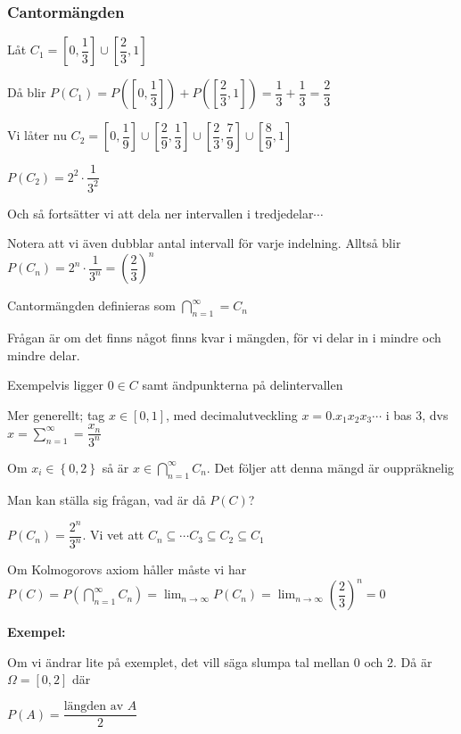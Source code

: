 \subsubsection{Cantormängden}
\par\bigskip
\noindent Låt $C_1 = [0,\dfrac{1}{3}]\cup[\dfrac{2}{3},1]$\par
\noindent Då blir $P(C_1) = P([0,\dfrac{1}{3}])+P([\dfrac{2}{3},1]) = \dfrac{1}{3}+\dfrac{1}{3}=\dfrac{2}{3}$
\par\bigskip
\noindent Vi låter nu $C_2 = [0,\dfrac{1}{9}]\cup[\dfrac{2}{9},\dfrac{1}{3}]\cup[\dfrac{2}{3},\dfrac{7}{9}]\cup[\dfrac{8}{9},1]$\par
\noindent $P(C_2) = 2^2\cdot\dfrac{1}{3^2}$\par
\par\bigskip
\noindent Och så fortsätter vi att dela ner intervallen i tredjedelar$\cdots$\par
\noindent Notera att vi även dubblar antal intervall för varje indelning. Alltså blir $P(C_n) = 2^n\cdot\dfrac{1}{3^n} = \left(\dfrac{2}{3}\right)^n$
\par\bigskip
\noindent Cantormängden definieras som $\bigcap_{n=1}^{\infty} = C_n$\par
\noindent Frågan är om det finns något finns kvar i mängden, för vi delar in i mindre och mindre delar.\par
\noindent Exempelvis ligger $0\in C$ samt ändpunkterna på delintervallen
\par\bigskip
\noindent Mer generellt; tag $x\in[0,1]$, med decimalutveckling $x = 0.x_1x_2x_3\cdots$ i bas 3, dvs $x = \sum_{n=1}^{\infty} = \dfrac{x_n}{3^n}$\par
\noindent Om $x_i\in\left\{0,2\right\}$ så är $x\in\bigcap_{n=1}^{\infty} C_n$. Det följer att denna mängd är ouppräknelig
\par\bigskip
\noindent Man kan ställa sig frågan, vad är då $P(C)$?\par
\noindent $P(C_n) = \dfrac{2^n}{3^n}$. Vi vet att $C_n\subseteq\cdots C_3\subseteq C_2\subseteq C_1$\par
\noindent Om Kolmogorovs axiom håller måste vi har $P(C) = P\left(\bigcap_{n=1}^{\infty}C_n\right) = \lim_{n\to\infty}P(C_n) = \lim_{n\to\infty}\left(\dfrac{2}{3}\right)^n=0$
\par\bigskip
\noindent\textbf{Exempel:}\par
\noindent Om vi ändrar lite på exemplet, det vill säga slumpa tal mellan 0 och 2. Då är $\Omega = [0,2]$ där\par\noindent $P(A) = \dfrac{\text{längden av $A$}}{2}$ 

